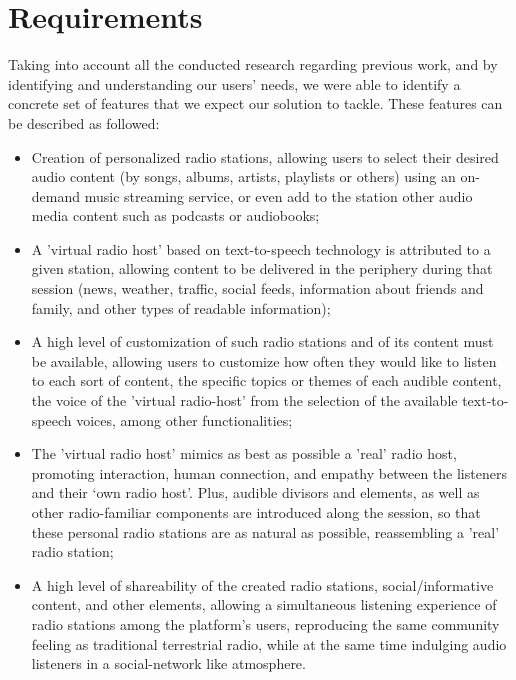 \section{Requirements} 
\label{sec:req}

Taking into account all the conducted research regarding previous work, and by identifying and understanding our users' needs, we were able to identify a concrete set of features that we expect our solution to tackle. These features can be described as followed:

\begin{itemize}
	\item Creation of personalized radio stations, allowing users to select their desired audio content (by songs, albums, artists, playlists or others) using an on-demand music streaming service, or even add to the station other audio media content such as podcasts or audiobooks;
	\item A 'virtual radio host' based on text-to-speech technology is attributed to a given station, allowing content to be delivered in the periphery during that session (news, weather, traffic, social feeds, information about friends and family, and other types of readable information);
	\item A high level of customization of such radio stations and of its content must be available, allowing users to customize how often they would like to listen to each sort of content, the specific topics or themes of each audible content, the voice of the 'virtual radio-host' from the selection of the available text-to-speech voices, among other functionalities;
	\item The 'virtual radio host' mimics as best as possible a 'real' radio host, promoting interaction, human connection, and empathy between the listeners and their ‘own radio host’. Plus, audible divisors and elements, as well as other radio-familiar components are introduced along the session, so that these personal radio stations are as natural as possible, reassembling a 'real' radio station;
	\item A high level of shareability of the created radio stations, social/informative content, and other elements, allowing a simultaneous listening experience of radio stations among the platform's users, reproducing the same community feeling as traditional terrestrial radio, while at the same time indulging audio listeners in a social-network like atmosphere.
\end{itemize}

